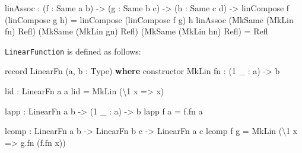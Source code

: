 \documentclass[
]{article}
\newenvironment{Shaded}{}{}
\newcommand{\DataTypeTok}[1]{\textcolor[rgb]{0.56,0.13,0.00}{#1}}
\newcommand{\DecValTok}[1]{\textcolor[rgb]{0.25,0.63,0.44}{#1}}
\newcommand{\KeywordTok}[1]{\textcolor[rgb]{0.00,0.44,0.13}{\textbf{#1}}}
\newcommand{\NormalTok}[1]{#1}
\newcommand{\OperatorTok}[1]{\textcolor[rgb]{0.40,0.40,0.40}{#1}}
\newcommand{\OtherTok}[1]{\textcolor[rgb]{0.00,0.44,0.13}{#1}}
\begin{document}
\begin{Shaded}
\begin{Highlighting}[]
\NormalTok{linAssoc }\OperatorTok{:}\NormalTok{ (f }\OperatorTok{:} \DataTypeTok{Same}\NormalTok{ a b) }\OtherTok{{-}\textgreater{}}
\NormalTok{           (g }\OperatorTok{:} \DataTypeTok{Same}\NormalTok{ b c) }\OtherTok{{-}\textgreater{}}
\NormalTok{           (h }\OperatorTok{:} \DataTypeTok{Same}\NormalTok{ c d) }\OtherTok{{-}\textgreater{}}
\NormalTok{           linCompose f (linCompose g h) }\OtherTok{=}\NormalTok{ linCompose (linCompose f g) h}
\NormalTok{linAssoc (}\DataTypeTok{MkSame}\NormalTok{ (}\DataTypeTok{MkLin}\NormalTok{ fn) }\DataTypeTok{Refl}\NormalTok{)}
\NormalTok{         (}\DataTypeTok{MkSame}\NormalTok{ (}\DataTypeTok{MkLin}\NormalTok{ gn) }\DataTypeTok{Refl}\NormalTok{)}
\NormalTok{         (}\DataTypeTok{MkSame}\NormalTok{ (}\DataTypeTok{MkLin}\NormalTok{ hn) }\DataTypeTok{Refl}\NormalTok{) }\OtherTok{=} \DataTypeTok{Refl}
\end{Highlighting}
\end{Shaded}

\texttt{LinearFunction} is defined as follows:

\begin{Shaded}
\begin{Highlighting}[]
\NormalTok{record }\DataTypeTok{LinearFn}\NormalTok{ (a, b }\OperatorTok{:} \DataTypeTok{Type}\NormalTok{) }\KeywordTok{where}
\NormalTok{  constructor }\DataTypeTok{MkLin}
\NormalTok{  fn }\OperatorTok{:}\NormalTok{ (}\DecValTok{1}\NormalTok{ \_ }\OperatorTok{:}\NormalTok{ a) }\OtherTok{{-}\textgreater{}}\NormalTok{ b}

\NormalTok{lid }\OperatorTok{:} \DataTypeTok{LinearFn}\NormalTok{ a a}
\NormalTok{lid }\OtherTok{=} \DataTypeTok{MkLin}\NormalTok{ (\textbackslash{}}\DecValTok{1}\NormalTok{ x }\OtherTok{=\textgreater{}}\NormalTok{ x)}

\NormalTok{lapp }\OperatorTok{:} \DataTypeTok{LinearFn}\NormalTok{ a b }\OtherTok{{-}\textgreater{}}\NormalTok{ (}\DecValTok{1}\NormalTok{ \_ }\OperatorTok{:}\NormalTok{ a) }\OtherTok{{-}\textgreater{}}\NormalTok{ b}
\NormalTok{lapp f a }\OtherTok{=}\NormalTok{ f}\OperatorTok{.}\NormalTok{fn a}

\NormalTok{lcomp }\OperatorTok{:} \DataTypeTok{LinearFn}\NormalTok{ a b }\OtherTok{{-}\textgreater{}} \DataTypeTok{LinearFn}\NormalTok{ b c }\OtherTok{{-}\textgreater{}} \DataTypeTok{LinearFn}\NormalTok{ a c}
\NormalTok{lcomp f g }\OtherTok{=} \DataTypeTok{MkLin}\NormalTok{ (\textbackslash{}}\DecValTok{1}\NormalTok{ x }\OtherTok{=\textgreater{}}\NormalTok{ g}\OperatorTok{.}\NormalTok{fn (f}\OperatorTok{.}\NormalTok{fn x))}
\end{Highlighting}
\end{Shaded}
\end{document}
